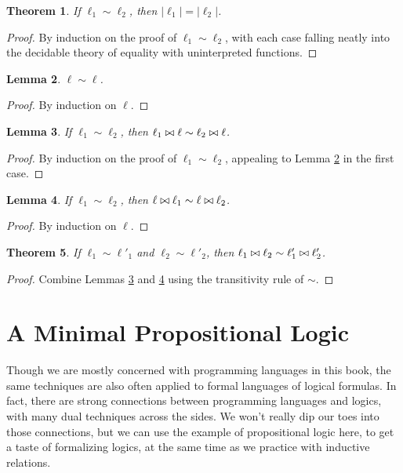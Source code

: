 \documentclass{amsbook}
\newtheorem{theorem}{Theorem}[chapter]
\newtheorem{lemma}[theorem]{Lemma}
\theoremstyle{definition}
\theoremstyle{remark}
\numberwithin{section}{chapter}
\numberwithin{equation}{chapter}
\begin{document}
\begin{theorem}
  If $\ell_1 \sim \ell_2$, then $|\ell_1| = |\ell_2|$.
\end{theorem}
\begin{proof}
  By induction on the proof of $\ell_1 \sim \ell_2$, with each case falling neatly into the decidable theory of equality with uninterpreted functions.
\end{proof}

\begin{lemma}\label{Permutation_refl}
  $\ell \sim \ell$.
\end{lemma}
\begin{proof}
  By induction on $\ell$.
\end{proof}
  
\begin{lemma}\label{Permutation_app1}
  If $\ell_1 \sim \ell_2$, then $\ell_1 \bowtie \ell \sim \ell_2 \bowtie \ell$.
\end{lemma}
\begin{proof}
  By induction on the proof of $\ell_1 \sim \ell_2$, appealing to Lemma \ref{Permutation_refl} in the first case.
\end{proof}

\begin{lemma}\label{Permutation_app2}
  If $\ell_1 \sim \ell_2$, then $\ell \bowtie \ell_1 \sim \ell \bowtie \ell_2$.
\end{lemma}
\begin{proof}
  By induction on $\ell$.
\end{proof}

\begin{theorem}
  If $\ell_1 \sim \ell'_1$ and $\ell_2 \sim \ell'_2$, then $\ell_1 \bowtie \ell_2 \sim \ell'_1 \bowtie \ell'_2$.
\end{theorem}
\begin{proof}
  Combine Lemmas \ref{Permutation_app1} and \ref{Permutation_app2} using the transitivity rule of $\sim$.
\end{proof}

\section{A Minimal Propositional Logic}

Though we are mostly concerned with programming languages in this book, the same techniques are also often applied to formal languages of logical formulas.
In fact, there are strong connections between programming languages and logics, with many dual techniques across the sides.
We won't really dip our toes into those connections, but we can use the example of propositional logic here, to get a taste of formalizing logics, at the same time as we practice with inductive relations.
\end{document}
